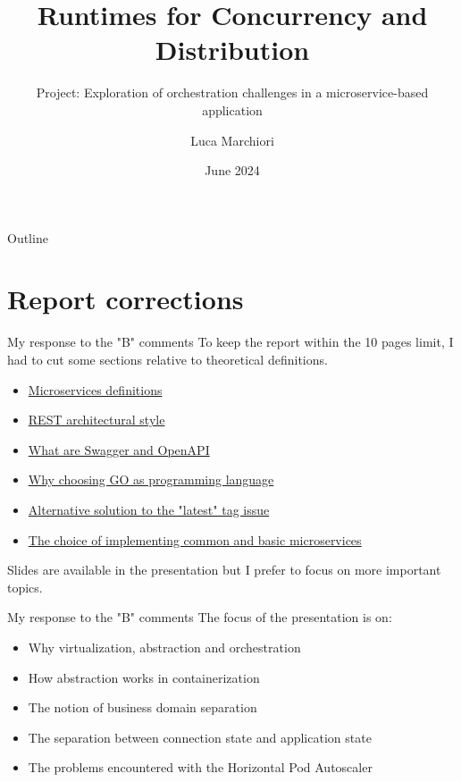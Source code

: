 \documentclass{beamer}
\title{Runtimes for Concurrency and Distribution}
\subtitle{Project: Exploration of orchestration challenges in a microservice-based application}
\author{Luca Marchiori}
\date{June 2024}
\begin{document}
\maketitle

\begin{frame}{Outline}
	\tableofcontents
\end{frame}


\section{Report corrections}


\begin{frame}{My response to the "B" comments}
	\label{index_1}
	To keep the report within the 10 pages limit, I had to cut some sections relative to theoretical definitions.
		\begin{itemize}
			\item \hyperlink{microservices_definitions}{Microservices definitions}
			\item \hyperlink{rest}{REST architectural style}
			\item \hyperlink{swagger_openapi}{What are Swagger and OpenAPI}
			\item \hyperlink{golang}{Why choosing GO as programming language}
			\item \hyperlink{latest_tag}{Alternative solution to the "latest" tag issue}
			\item \hyperlink{common_ms}{The choice of implementing common and basic microservices}
		\end{itemize}

		Slides are available in the presentation but I prefer to focus on more important topics.
	\end{frame}

	\begin{frame}{My response to the "B" comments}
		\label{index_2}
		The focus of the presentation is on:
			\begin{itemize}
				\item Why virtualization, abstraction and orchestration
				\item How abstraction works in containerization
				\item The notion of business domain separation
				\item The separation between connection state and application state
				\item The problems encountered with the Horizontal Pod Autoscaler
			\end{itemize}
		\end{frame}
\end{document}
